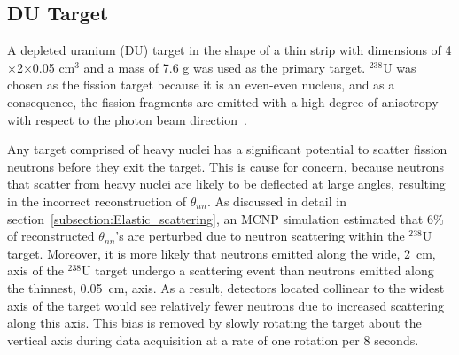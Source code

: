 \subsection{DU Target}
\label{subsection:targets}
A depleted uranium (DU) target in the shape of a thin strip with dimensions of 4$\times$2$\times$0.05 $\text{cm}^3$ and a mass of 7.6 g was used as the primary target.
$^{238}$U was chosen as the fission target because it is an even-even nucleus, and as a consequence, the fission fragments are emitted with a high degree of anisotropy with respect to the photon beam direction~\cite{1977FragAss}.

Any target comprised of heavy nuclei has a significant potential to scatter fission neutrons before they exit the target.
This is cause for concern, because neutrons that scatter from heavy nuclei are likely to be deflected at large angles, resulting in the incorrect reconstruction of $\theta_{nn}$.
As discussed in detail in section~\ref{subsection:Elastic_scattering}, an MCNP simulation estimated that 6\% of reconstructed $\theta_{nn}$'s are perturbed due to neutron scattering within the $^{238}$U target.
Moreover, it is more likely that neutrons emitted along the wide, 2~cm, axis of the $^{238}$U target undergo a scattering event than neutrons emitted along the thinnest, 0.05~cm, axis.
As a result, detectors located collinear to the widest axis of the target would see relatively fewer neutrons due to increased scattering along this axis. 
This bias is removed by slowly rotating the target about the vertical axis during data acquisition at a rate of one rotation per 8 seconds.

